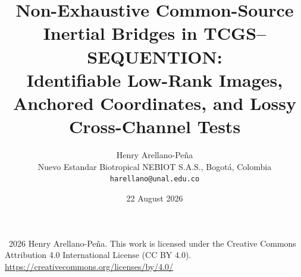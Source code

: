 \documentclass[11pt]{article}
\begin{document}
\title{\textbf{Non-Exhaustive Common-Source Inertial Bridges in TCGS--SEQUENTION:}\\
Identifiable Low-Rank Images, Anchored Coordinates, and Lossy Cross-Channel Tests}

\author{Henry Arellano-Pe\~na\\
Nuevo Estandar Biotropical NEBIOT S.A.S., Bogot\'a, Colombia\\
\texttt{harellano@unal.edu.co}}

\date{22 August 2026}
\maketitle

\begin{center}
\small
\textcopyright\ 2026 Henry Arellano-Pe\~na. This work is licensed under the Creative Commons Attribution 4.0 International License (CC BY 4.0).\\
\url{https://creativecommons.org/licenses/by/4.0/}
\end{center}
\end{document}
